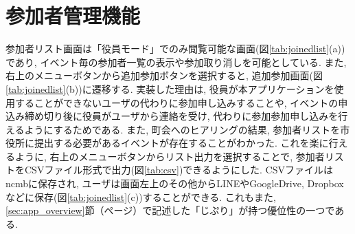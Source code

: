\section{参加者管理機能}%
参加者リスト画面は「役員モード」でのみ閲覧可能な画面(図\ref{tab:joinedlist}(a))であり, イベント毎の参加者一覧の表示や参加取り消しを可能としている. また, 右上のメニューボタンから追加参加ボタンを選択すると, 追加参加画面(図\ref{tab:joinedlist}(b))に遷移する. 実装した理由は, 役員が本アプリケーションを使用することができないユーザの代わりに参加申し込みすることや, イベントの申込み締め切り後に役員がユーザから連絡を受け, 代わりに参加参加申し込みを行えるようにするためである. また, 町会へのヒアリングの結果, 参加者リストを市役所に提出する必要があるイベントが存在することがわかった. これを楽に行えるように, 右上のメニューボタンからリスト出力を選択することで, 参加者リストをCSVファイル形式で出力(図\ref{tab:csv})できるようにした. CSVファイルはncmbに保存され, ユーザは画面左上のその他からLINEやGoogleDrive, Dropboxなどに保存(図\ref{tab:joinedlist}(c))することができる. これもまた, \ref{sec:app_overview}節（\pageref{sec:app_overview}ページ）で記述した「じぷり」が持つ優位性の一つである.
\clearpage

